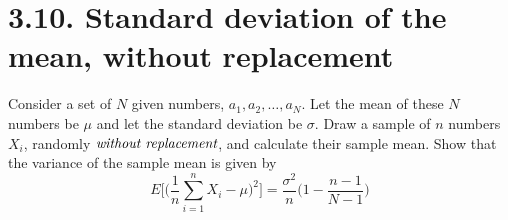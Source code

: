 \section*{3.10. Standard deviation of the mean, without replacement}
Consider a set of $N$ given numbers, $a_1, a_2, \ldots, a_N$. Let the mean of these
$N$ numbers be $\mu$ and let the standard deviation be $\sigma$. Draw a sample
of $n$ numbers $X_i$, randomly $\emph{without replacement}$, and calculate 
their sample mean. Show that the variance of the sample mean is given by
\begin{equation*}\tag{3.91}
    E\bigg[\bigg(\frac{1}{n}\sum_{i = 1}^n X_i - \mu\bigg)^2\bigg] 
    = \frac{\sigma^2}{n}\bigg(1 - \frac{n-1}{N-1}\bigg)
\end{equation*}

\vspace{1em}


